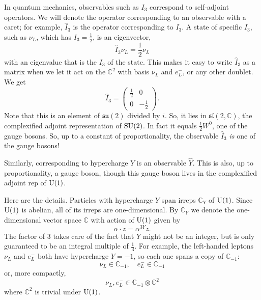 \documentclass[12pt]{article}
\newcommand{\C}{{\mathbb C}}  %
\newcommand{\U}{{\rm U}}    %
\newcommand{\SU}{{\rm SU}}    %
\renewcommand{\sl}{\mathfrak{sl}} %
\newcommand{\su}{{\mathfrak{su}}}  %
\newcommand{\half}{\frac{1}{2}} %
\newcommand{\third}{\frac{1}{3}} %
\begin{document}
In quantum mechanics, observables such as $I_3$ correspond to self-adjoint
operators.  We will denote the operator corresponding to an observable with a
caret; for example, $\hat{I}_3$ is the operator corresponding to $I_3$. A state
of specific $I_3$, such as $\nu_L$, which has $I_3 = \half$, is an eigenvector,
\[ \hat{I}_3 \nu_L = \half \nu_L \]
with an eigenvalue that is the $I_3$ of the state. This makes it easy to write
$\hat{I}_3$ as a matrix when we let it act on the $\C^2$ with basis $\nu_L$ and
$e^-_L$, or any other doublet. We get
\[ \hat{I}_3 = \left(\begin{array}{cc} \half & 0 \\ 0 & -\half \end{array} \right). \]
Note that this is an element of $\su(2)$ divided by $i$.   So, it lies in
$\sl(2, \C)$, the complexified adjoint representation of $\SU(2)$.  
In fact it equals $\half W^0$, one of the gauge bosons. So, up to a constant
of proportionality, the observable $\hat{I}_3$ \emph{is} one of the gauge
bosons!

Similarly, corresponding to hypercharge $Y$ is an observable $\hat{Y}$. This is
also, up to proportionality, a gauge boson, though this gauge boson lives in
the complexified adjoint rep of $\U(1)$.

Here are the details. Particles with hypercharge $Y$ span irreps $\C_Y$ of $\U(1)$. Since
$\U(1)$ is abelian, all of its irreps are one-dimensional.  By $\C_Y$ we denote
the one-dimensional vector space $\C$ with action of $\U(1)$ given by 
\[ \alpha \cdot z = \alpha^{3Y} z. \]
The factor of $3$ takes care of the fact that $Y$ might not be an integer, 
but is only guaranteed to be an integral multiple of $\third$. 
For example, the left-handed leptons $\nu_L$ and $e^-_L$ both have hypercharge
$Y = -1$, so each one spans a copy of $\C_{-1}$:
\[ \nu_L \in \C_{-1}, \quad e^-_L \in \C_{-1} \]
or, more compactly, 
\[ \nu_L, e^-_L \in \C_{-1} \otimes \C^2 \]
where $\C^2$ is trivial under $\U(1)$. 
\end{document}
